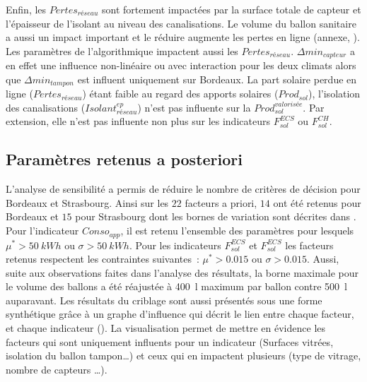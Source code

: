 Enfin, les $Pertes_{réseau}$ sont fortement impactées par la surface totale de capteur et
l’épaisseur de l’isolant au niveau des canalisations. Le volume du ballon sanitaire a
aussi un impact important et le réduire augmente les pertes en ligne (annexe, ).
Les paramètres de l’algorithmique impactent
aussi les $Pertes_{réseau}$. $\Delta min_{capteur}$ a en effet une influence non-linéaire
ou avec interaction pour les deux climats alors que $\Delta min_{tampon}$ est influent
uniquement sur Bordeaux. La part solaire perdue en ligne ($Pertes_{réseau}$) étant faible
au regard des apports solaires ($Prod_{sol}$), l’isolation des canalisations
($Isolant_{réseau}^{ep}$) n’est pas influente sur la $Prod_{sol}^{valorisée}$. Par
extension, elle n’est pas influente non plus sur les indicateurs $F_{sol}^{ECS}$ ou
$F_{sol}^{CH}$.



\subsection{Paramètres retenus a posteriori} %
\label{sub:parametres_retenus_a_posteriori}
L’analyse de sensibilité a permis de réduire le nombre de critères de décision
pour Bordeaux et Strasbourg. Ainsi sur les $22$ facteurs a priori, $14$ ont été retenus
pour Bordeaux et $15$ pour Strasbourg dont les bornes de variation sont décrites
dans . Pour l’indicateur $Conso_{app}$, il est retenu
l’ensemble des paramètres pour lesquels $\mu^{*} > \SI{50}{kWh}$ ou $\sigma > \SI{50}{kWh}$. Pour
les indicateurs $F_{sol}^{ECS}$ et $F_{sol}^{ECS}$ les facteurs retenus respectent
les contraintes suivantes~: $\mu^{*} > 0.015$ ou $\sigma > 0.015$.
Aussi, suite aux observations faites dans l’analyse des résultats, la borne maximale pour le volume des
ballons a été réajustée à \SI{400}{\litre} maximum par ballon contre \SI{500}{\litre}
auparavant.
Les résultats du criblage sont aussi présentés sous une forme synthétique grâce à un
graphe d’influence qui décrit le lien entre chaque facteur, et chaque indicateur
(). La visualisation permet de mettre en évidence
les facteurs qui sont uniquement influents pour un indicateur (Surfaces vitrées, isolation du ballon tampon\dots) et
ceux qui en impactent plusieurs (type de vitrage, nombre de capteurs \dots).


